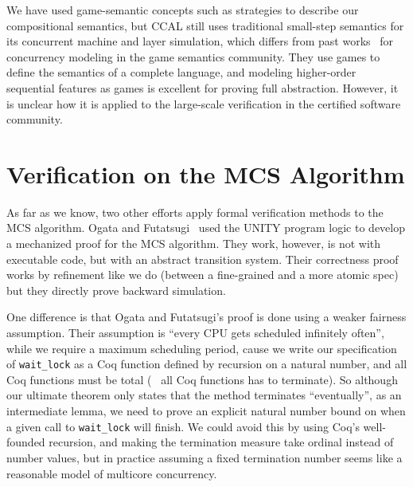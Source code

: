 
We have used
game-semantic concepts such as strategies to describe our
compositional semantics, 
but CCAL still uses traditional small-step semantics for its concurrent machine and layer simulation, which differs from 
past works~\cite{ghica08,nishimura13,rideau11,abramsky99}  for concurrency modeling in the game semantics community.
They use games to
define the semantics of a complete language, 
and modeling higher-order sequential features as games is excellent for proving full abstraction. 
However, it is unclear how it is applied to the large-scale verification in the certified software community.



\section{Verification on the MCS Algorithm}
\label{chatper:related:sec:verification-on-the-mcs-algorithm}

As far as we know, two other efforts apply formal verification methods
to the MCS algorithm.  Ogata and Futatsugi~\cite{ogata:mcs-lock} used the UNITY program logic to develop a mechanized proof for the MCS algorithm.
They work, however, is not with executable code, but with an abstract transition system. 
Their correctness proof works by refinement like we do (between a fine-grained
and a more atomic spec) but they directly prove backward
simulation.

One difference is that Ogata and Futatsugi's proof is
done using a weaker fairness assumption.
Their assumption is ``every CPU gets
scheduled infinitely often'', while we require a maximum scheduling
period,  cause we write our specification of \lstinline$wait_lock$ as a Coq function defined by recursion on a natural number, and all Coq functions must be total (\ie~ all Coq functions has to terminate). 
So although our ultimate theorem only states that the method
terminates ``eventually'', as an intermediate lemma, we need to prove an explicit natural number bound on when a given call to
\lstinline$wait_lock$ will finish.  
We could avoid this by using
Coq's well-founded recursion, and
making the termination measure take ordinal instead of number
values, but in practice assuming a fixed termination number seems like a reasonable
model of multicore concurrency.

